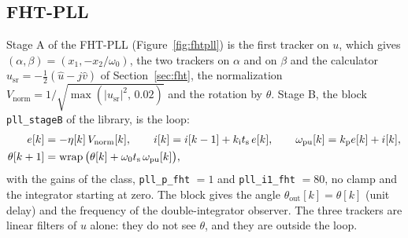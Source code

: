 \documentclass[11pt,a4paper]{scrartcl}
\newcommand{\ped}[1]{_{\mathrm{#1}}}
\newcommand{\code}[1]{\texttt{#1}}
\newcommand{\wrapop}{\operatorname{wrap}}
\begin{document}
\begin{onehalfspace}
\subsection{FHT-PLL}
\label{sec:fhtpll}

Stage A of the FHT-PLL (Figure~\ref{fig:fhtpll}) is the first tracker on $u$, which gives $(\alpha, \beta) = (x_1, -x_2/\omega_0)$, the two trackers on $\alpha$ and on $\beta$ and the calculator $u\ped{sr} = -\tfrac12(\hat u - j\hat v)$ of Section~\ref{sec:fht}, the normalization $V\ped{norm} = 1/\sqrt{\max(|u\ped{sr}|^2,\, 0.02)}$ and the rotation by $\theta$. Stage B, the block \code{pll\_stageB} of the library, is the loop:
\begin{align}
	e[k] &= -\eta[k]\, V\ped{norm}[k], \qquad i[k] = i[k-1] + k\ped{i} t\ped{s}\, e[k], \qquad \omega\ped{pu}[k] = k\ped{p} e[k] + i[k], \notag \\
	\theta[k+1] &= \wrapop\big(\theta[k] + \omega_0 t\ped{s}\, \omega\ped{pu}[k]\big),
	\label{eq:stageB}
\end{align}
with the gains of the class, \code{pll\_p\_fht} $= 1$ and \code{pll\_i1\_fht} $= 80$, no clamp and the integrator starting at zero. The block gives the angle $\theta\ped{out}[k] = \theta[k]$ (unit delay) and the frequency of the double-integrator observer. The three trackers are linear filters of $u$ alone: they do not see $\theta$, and they are outside the loop.


\end{onehalfspace}
\end{document}
